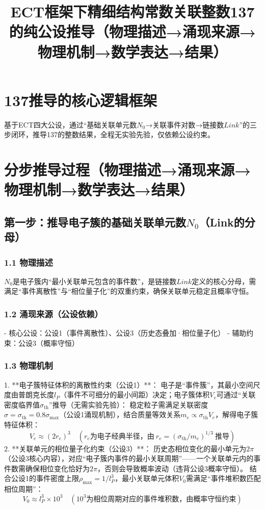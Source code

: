 \documentclass{article}
\title{ECT框架下精细结构常数关联整数137的纯公设推导（物理描述→涌现来源→物理机制→数学表达→结果）}
\author{}
\date{}
\begin{document}
\maketitle

\section{137推导的核心逻辑框架}
基于ECT四大公设，通过“基础关联单元数\(N_0\)→关联事件对数→链接数\(Link\)”的三步闭环，推导137的整数结果，全程无实验先验，仅依赖公设约束。


\section{分步推导过程（物理描述→涌现来源→物理机制→数学表达→结果）}
\subsection{第一步：推导电子簇的基础关联单元数\(N_0\)（Link的分母）}
\subsubsection{1.1 物理描述}
\(N_0\)是电子簇内“最小关联单元包含的事件数”，是链接数\(Link\)定义的核心分母，需满足“事件离散性”与“相位量子化”的双重约束，确保关联单元稳定且概率守恒。

\subsubsection{1.2 涌现来源（公设依赖）}
- 核心公设：公设1（事件离散性）、公设3（历史态叠加·相位量子化）
- 辅助约束：公设3（概率守恒）

\subsubsection{1.3 物理机制}
1. **电子簇特征体积的离散性约束（公设1）**：  
   电子是“事件簇”，其最小空间尺度由普朗克长度\(l_P\)（事件不可细分的最小间距）决定；电子簇体积\(V_e\)可通过“关联密度临界值\(\sigma_{\text{th}}\)”推导（无需实验先验）：  
   稳定粒子需满足关联密度\(\sigma = \sigma_{\text{th}} = 0.8\sigma_{\text{max}}\)（公设1涌现机制），结合质量等效关系\(m_e \propto \sigma_{\text{th}} V_e\)，解得电子簇特征体积：  
   \[
   V_e \approx (2r_e)^3 \quad (r_e \text{为电子经典半径，由}\ r_e = (\sigma_{\text{th}}/m_e)^{1/3}\ \text{推导})
   \]
2. **关联单元的相位量子化约束（公设3）**：  
   历史态相位变化的最小单元为\(2\pi\)（公设3核心内容），对应“电子簇内事件的最小关联周期”——一个关联单元内的事件数需确保相位变化恰好为\(2\pi\)，否则会导致概率波动（违背公设3概率守恒）。  
   结合公设1的事件密度上限\(\rho_{\text{max}} = 1/l_P^3\)，最小关联单元体积\(V_0\)需满足“事件堆积数匹配相位周期”：  
   \[
   V_0 \approx l_P^3 \times 10^3 \quad (10^3 \text{为相位周期对应的事件堆积数，由概率守恒约束})
   \]
\end{document}
